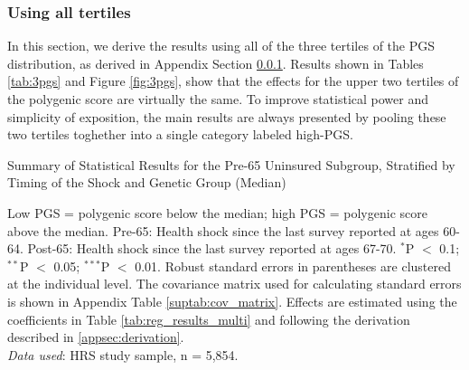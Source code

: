 \subsubsection{Using all tertiles} \label{appsec:3pgs}

In this section, we derive the results using all of the three tertiles of the PGS distribution, as derived in Appendix Section \ref{appsec:3pgs}.
Results shown in Tables \ref{tab:3pgs} and Figure \ref{fig:3pgs}, show that the effects for the upper two tertiles of the polygenic score are virtually the same.
To improve statistical power and simplicity of exposition, the main results are always presented by pooling these two tertiles toghether into a single category labeled high-PGS.

\begin{table}[!ht]
	\caption{Summary of Statistical Results for the Pre-65 Uninsured Subgroup, Stratified by Timing of the Shock and Genetic Group (Median)}
	\label{tab:3pgs}
	
		\begin{flushleft}
			Low PGS = polygenic score below the median; high PGS = polygenic score above the median.
			Pre-65: Health shock since the last survey reported at ages 60-64.
			Post-65: Health shock since the last survey reported at ages 67-70.
			$^{*}$P $<$ 0.1; $^{**}$P $<$ 0.05; $^{***}$P $<$ 0.01. Robust standard errors in parentheses are clustered at the individual level.
			The covariance matrix used for calculating standard errors is shown in Appendix Table \ref{suptab:cov_matrix}.
			Effects are estimated using the coefficients in Table \ref{tab:reg_results_multi} and following the derivation described in \ref{appsec:derivation}.\\
			\textit{Data used}: HRS study sample, n = 5,854.
		\end{flushleft}
\end{table}


